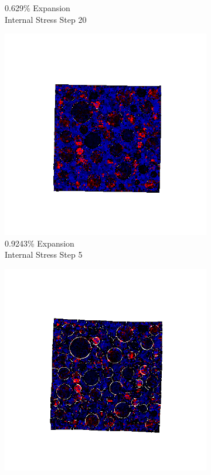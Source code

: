 \begin{figure}[ht!]
\begin{subfigure}{.25\textwidth}
      \caption{0.629\% Expansion\\Internal Stress Step 20}
    \end{subfigure}

    \begin{subfigure}{.25\textwidth}
      \centering
      \includegraphics[width=1.0\linewidth]{Files/exp_3D/ASR/A30P75_5_s5.png}
      \caption{0.9243\% Expansion\\Internal Stress Step 5}
    \end{subfigure}%
    \begin{subfigure}{.25\textwidth}
      \centering
      \includegraphics[width=1.0\linewidth]{Files/exp_3D/ASR/A30P75_5_s10.png}

\end{subfigure}
\end{figure}
